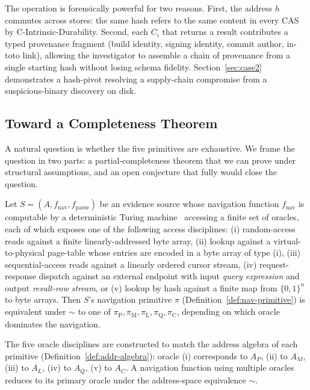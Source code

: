 \smallskip
The operation is forensically powerful for two reasons. First, the address
$h$ commutes across stores: the same hash refers to the same content in
every CAS by C-Intrinsic-Durability. Second, each $C_i$ that returns a
result contributes a typed provenance fragment (build identity, signing
identity, commit author, in-toto link), allowing the investigator to
assemble a chain of provenance from a single starting hash without losing
schema fidelity. Section~\ref{sec:case2} demonstrates a hash-pivot
resolving a supply-chain compromise from a suspicious-binary discovery on
disk.

\subsection{Toward a Completeness Theorem}
\label{sec:completeness-formal}

A natural question is whether the five primitives are exhaustive. We frame
the question in two parts: a partial-completeness theorem that we can prove
under structural assumptions, and an open conjecture that fully would close
the question.

\begin{proposition}
\label{thm:partial-complete}
Let $S = (A, f_{\mathrm{nav}}, f_{\mathrm{parse}})$ be an evidence source
whose navigation function $f_{\mathrm{nav}}$ is computable by a
deterministic Turing machine~\cite{sipser2012computation} accessing a
finite set of oracles, each of which exposes one of the following access
disciplines: (i) random-access reads against a finite linearly-addressed
byte array, (ii) lookup against a virtual-to-physical page-table whose
entries are encoded in a byte array of type (i), (iii) sequential-access
reads against a linearly ordered cursor stream, (iv) request-response
dispatch against an external endpoint with input \emph{query expression}
and output \emph{result-row stream}, or (v) lookup by hash against a
finite map from $\{0,1\}^n$ to byte arrays. Then $S$'s navigation primitive
$\pi$ (Definition~\ref{def:nav-primitive}) is equivalent under $\sim$ to
one of $\pi_{\mathrm{P}}, \pi_{\mathrm{M}}, \pi_{\mathrm{L}}, \pi_{\mathrm{Q}},
\pi_{\mathrm{C}}$, depending on which oracle dominates the navigation.
\end{proposition}

The five oracle disciplines are constructed to match the address algebra of
each primitive (Definition~\ref{def:addr-algebra}): oracle (i) corresponds
to $A_P$, (ii) to $A_M$, (iii) to $A_L$, (iv) to $A_Q$, (v) to $A_C$.
A navigation function using multiple oracles reduces to its primary oracle
under the address-space equivalence $\sim$.

